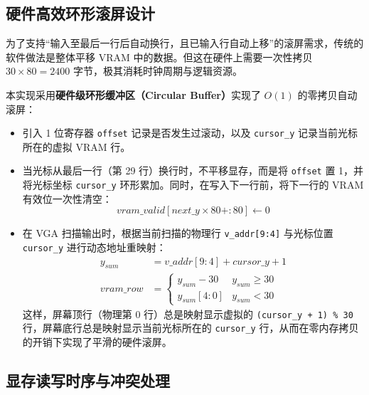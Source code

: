 \documentclass[12pt, a4paper]{ctexart}
\begin{document}
\subsection{硬件高效环形滚屏设计}

为了支持“输入至最后一行后自动换行，且已输入行自动上移”的滚屏需求，传统的软件做法是整体平移 VRAM 中的数据。但这在硬件上需要一次性拷贝 $30 \times 80 = 2400$ 字节，极其消耗时钟周期与逻辑资源。

本实现采用\textbf{硬件级环形缓冲区（Circular Buffer）}实现了 $O(1)$ 的零拷贝自动滚屏：
\begin{itemize}
    \item 引入 1 位寄存器 \texttt{offset} 记录是否发生过滚动，以及 \texttt{cursor\_y} 记录当前光标所在的虚拟 VRAM 行。
    \item 当光标从最后一行（第 29 行）换行时，不平移显存，而是将 \texttt{offset} 置 1，并将光标坐标 \texttt{cursor\_y} 环形累加。同时，在写入下一行前，将下一行的 VRAM 有效位一次性清空：
    \begin{equation}
        vram\_valid[next\_y \times 80 +: 80] \leftarrow 0
    \end{equation}
    \item 在 VGA 扫描输出时，根据当前扫描的物理行 \texttt{v\_addr[9:4]} 与光标位置 \texttt{cursor\_y} 进行动态地址重映射：
    \begin{align}
        y_{sum} &= v\_addr[9:4] + cursor\_y + 1 \\
        vram\_row &= \begin{cases}
            y_{sum} - 30 & y_{sum} \ge 30 \\
            y_{sum}[4:0] & y_{sum} < 30
        \end{cases}
    \end{align}
    这样，屏幕顶行（物理第 0 行）总是映射显示虚拟的 \texttt{(cursor\_y + 1) \% 30} 行，屏幕底行总是映射显示当前光标所在的 \texttt{cursor\_y} 行，从而在零内存拷贝的开销下实现了平滑的硬件滚屏。
\end{itemize}

\subsection{显存读写时序与冲突处理}
\end{document}
